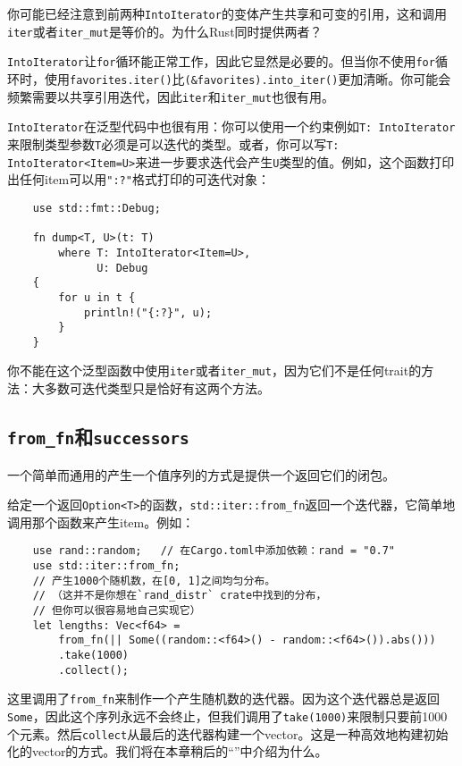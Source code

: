 你可能已经注意到前两种\texttt{IntoIterator}的变体产生共享和可变的引用，这和调用\texttt{iter}或者\texttt{iter\_mut}是等价的。为什么Rust同时提供两者？

\texttt{IntoIterator}让\texttt{for}循环能正常工作，因此它显然是必要的。但当你不使用\texttt{for}循环时，使用\texttt{favorites.iter()}比\texttt{(\&favorites).into\_iter()}更加清晰。你可能会频繁需要以共享引用迭代，因此\texttt{iter}和\texttt{iter\_mut}也很有用。

\texttt{IntoIterator}在泛型代码中也很有用：你可以使用一个约束例如\texttt{T: IntoIterator}来限制类型参数\texttt{T}必须是可以迭代的类型。或者，你可以写\texttt{T: IntoIterator<Item=U>}来进一步要求迭代会产生\texttt{U}类型的值。例如，这个函数打印出任何item可以用\texttt{"{:?}"}格式打印的可迭代对象：
\begin{verbatim}
    use std::fmt::Debug;

    fn dump<T, U>(t: T)
        where T: IntoIterator<Item=U>,
              U: Debug
    {
        for u in t {
            println!("{:?}", u);
        }
    }
\end{verbatim}
你不能在这个泛型函数中使用\texttt{iter}或者\texttt{iter\_mut}，因为它们不是任何trait的方法：大多数可迭代类型只是恰好有这两个方法。

\subsection{\texttt{from\_fn}和\texttt{successors}}

一个简单而通用的产生一个值序列的方式是提供一个返回它们的闭包。

给定一个返回\texttt{Option<T>}的函数，\texttt{std::iter::from\_fn}返回一个迭代器，它简单地调用那个函数来产生item。例如：
\begin{verbatim}
    use rand::random;   // 在Cargo.toml中添加依赖：rand = "0.7"
    use std::iter::from_fn;
    // 产生1000个随机数，在[0, 1]之间均匀分布。
    // （这并不是你想在`rand_distr` crate中找到的分布，
    // 但你可以很容易地自己实现它）
    let lengths: Vec<f64> =
        from_fn(|| Some((random::<f64>() - random::<f64>()).abs()))
        .take(1000)
        .collect();
\end{verbatim}

这里调用了\texttt{from\_fn}来制作一个产生随机数的迭代器。因为这个迭代器总是返回\texttt{Some}，因此这个序列永远不会终止，但我们调用了\texttt{take(1000)}来限制只要前1000个元素。然后\texttt{collect}从最后的迭代器构建一个vector。这是一种高效地构建初始化的vector的方式。我们将在本章稍后的“”中介绍为什么。

